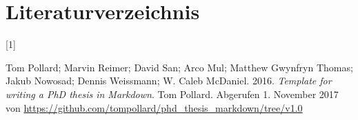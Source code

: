 \documentclass[listof=totoc,index=totoc,bibliography=totoc,12pt,german,a4paper,]{report}
\newlength{\cslhangindent}
\newlength{\csllabelwidth}
\newenvironment{CSLReferences}[2] %
 {%
  \setlength{\parindent}{0pt}
  \ifodd #1 \everypar{\setlength{\hangindent}{\cslhangindent}}\ignorespaces\fi
  \ifnum #2 > 0
  \setlength{\parskip}{#2\baselineskip}
  \fi
 }%
 {}
\newcommand{\CSLLeftMargin}[1]{\parbox[t]{\csllabelwidth}{#1}}
\newcommand{\CSLRightInline}[1]{\parbox[t]{\linewidth - \csllabelwidth}{#1}\break}
\begin{document}
\chapter{Literaturverzeichnis}\label{literaturverzeichnis}


\hypertarget{refs}{}
\begin{CSLReferences}{0}{0}
\leavevmode{}%
\CSLLeftMargin{{[}1{]} }%
\CSLRightInline{Tom Pollard; Marvin Reimer; David San; Arco Mul; Matthew
Gwynfryn Thomas; Jakub Nowosad; Dennis Weissmann; W. Caleb McDaniel.
2016. \emph{Template for writing a PhD thesis in Markdown}. Tom Pollard.
Abgerufen 1. November 2017 von
\url{https://github.com/tompollard/phd_thesis_markdown/tree/v1.0}}

\end{CSLReferences}
\end{document}
